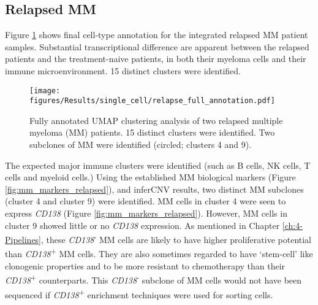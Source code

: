 \subsection{Relapsed MM}
Figure \ref{fig:full_anno_relapse} shows final cell-type annotation for the integrated relapsed MM patient samples.
Substantial transcriptional difference are apparent between the relapsed patients and the treatment-naive patients, in both their myeloma cells and their immune microenvironment.
15 distinct clusters were identified.
\begin{figure}[hpt]
\centering
\texttt{[image: figures/Results/single\_cell/relapse\_full\_annotation.pdf]}
\caption[scRNA-seq full annotation- relapsed MM]{Fully annotated UMAP clustering analysis of two relapsed multiple myeloma (MM) patients.
15 distinct clusters were identified.
Two subclones of MM were identified (circled; clusters 4 and 9).}
\label{fig:full_anno_relapse}
\end{figure}
The expected major immune clusters were identified (such as B cells, NK cells, T cells and myeloid cells.)
Using the established MM biological markers (Figure \ref{fig:mm_markers_relapsed}), and inferCNV results, two distinct MM subclones (cluster 4 and cluster 9) were identified.
MM cells in cluster 4 were seen to express \textit{CD138} (Figure \ref{fig:mm_markers_relapsed}).
However, MM cells in cluster 9 showed little or no \textit{CD138} expression.
As mentioned in Chapter \ref{ch:4-Pipelines}, these \textit{CD138}\textsuperscript{-} MM cells are likely to have higher proliferative potential than \textit{CD138}\textsuperscript{+} MM cells.
They are also sometimes regarded to have `stem-cell' like clonogenic properties and to be more resistant to chemotherapy than their \textit{CD138}\textsuperscript{+} counterparts\cite{setiadi2019cd138}.
This \textit{CD138}\textsuperscript{-} subclone of MM cells would not have been sequenced if \textit{CD138}\textsuperscript{+} enrichment techniques were used for sorting cells.

